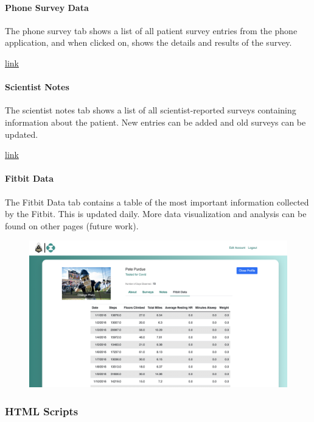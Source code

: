 \documentclass[]{book}
\let\oldparagraph\paragraph
\renewcommand{\paragraph}[1]{\oldparagraph{#1}\mbox{}}
\begin{document}
\paragraph{Phone Survey Data}\label{phone-survey-data}

The phone survey tab shows a list of all patient survey entries from the
phone application, and when clicked on, shows the details and results of
the survey.

\href{images/phone_survey_gif.gif}{link}

\paragraph{Scientist Notes}\label{scientist-notes}

The scientist notes tab shows a list of all scientist-reported surveys
containing information about the patient. New entries can be added and
old surveys can be updated.

\href{images/scientist_note_gif.gif}{link}

\paragraph{Fitbit Data}\label{fitbit-data}

The Fitbit Data tab contains a table of the most important information
collected by the Fitbit. This is updated daily. More data visualization
and analysis can be found on other pages (future work).

\begin{figure}
\centering
\includegraphics{images/Fitbit_page.png}
\caption{}
\end{figure}

\subsubsection{HTML Scripts}\label{html-scripts}
\end{document}
